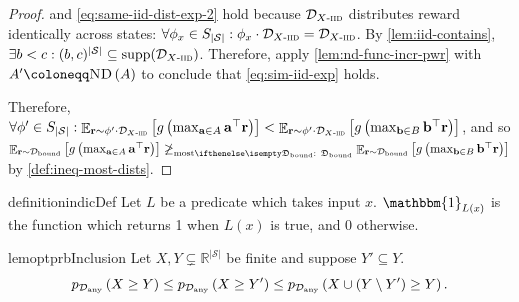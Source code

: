 \documentclass{article}
\renewcommand{\abs}[1]{\left|#1\right|}
\newcommand*{\prn}[1]{\left(#1\right)}
\newcommand*{\brx}[1]{\left[#1\right]}
\newcommand*{\defeq}{\coloneqq} %
\newcommand*{\av}{\mathbf{a}}
\newcommand*{\bv}{\mathbf{b}}
\newcommand*{\reals}{\mathbb{R}}
\newcommand*{\upsc}[1]{\text{\upshape\textsc{#1}}}
\newcommand*{\St}{\mathcal{S}}
\newcommand*{\rf}{\mathbf{r}} %
\newcommand*{\rewardVS}{\reals^{\abs{\St}}} %
\newcommand*{\D}{\mathcal{D}} %
\newcommand*{\distSet}{\mathfrak{D}}
\newcommand*{\Dany}{\D_{\text{any}}}
\newcommand*{\Dbd}{\D_{\text{bound}}}
\newcommand*{\DSetBd}{\distSet_\text{bound}}
\DeclareMathOperator*{\opE}{\mathbb{E}}
\newcommand*{\E}[2]{\opE_{#1}\brx{#2}} %
\newcommand*{\ND}[1]{\upsc{ND}\prn{#1}}
\newcommand*{\indic}[1]{\mathbbm{1}_{#1}} %
\newcommand*{\mdpPermGroup}{S_{\abs{\St}}}
\theoremstyle{definition}
\begin{document}
\begin{appendices}
\begin{proof}
 and \cref{eq:same-iid-dist-exp-2} hold because $\Diid$ distributes reward identically across states: $\forall \phi_x\in\mdpPermGroup: \phi_x\cdot \Diid=\Diid$. By \cref{lem:iid-contains}, $\exists b<c: (b,c)^{\abs{\St}}\subseteq \supp[\Diid]$. Therefore, apply \cref{lem:nd-func-incr-pwr} with $A'\defeq \ND{A}$ to conclude that \cref{eq:sim-iid-exp} holds.

Therefore, $\forall \phi' \in \mdpPermGroup: \E{\rf \sim \phi'\cdot \Diid}{g\prn{\max_{\av\in A}\av^\top \rf}}<\E{\rf \sim \phi'\cdot \Diid}{g\prn{\max_{\bv\in B}\bv^\top \rf}}$, and so $\E{\rf \sim \Dbd}{g\prn{\max_{\av\in A}\av^\top \rf}}\not\geqMost[][\DSetBd]  \E{\rf \sim \Dbd}{g\prn{\max_{\bv\in B}\bv^\top \rf}}$ by \cref{def:ineq-most-dists}.
\end{proof}

\begin{restatable}{definition}{indicDef}
Let $L$ be a predicate which takes input $x$. $\indic{L(x)}$ is the function which returns 1 when $L(x)$ is true, and 0 otherwise.
\end{restatable} 

\begin{restatable}{lem}{optprbInclusion}\label{lem:inclusion-opt}
Let $X,Y\subsetneq \rewardVS$ be finite and suppose $Y'\subseteq Y$. \begin{equation}
    \phelper{X\geq Y}[\Dany]\leq\phelper{X\geq Y'}[\Dany]\leq \phelper{X\cup\prn{Y\setminus Y'}\geq Y}[\Dany].\label{eq:inclusion-opt}
\end{equation}


\end{restatable}
\end{appendices}
\end{document}
